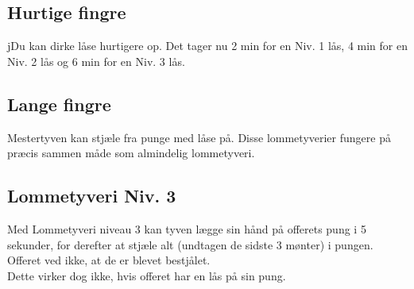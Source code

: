 \subsection*{Hurtige fingre}
jDu kan dirke låse hurtigere op. Det tager nu 2 min for en Niv. 1 lås, 4 min for en Niv. 2 lås og 6 min for en Niv. 3 lås.\\

\subsection*{Lange fingre}
Mestertyven kan stjæle fra punge med låse på. Disse lommetyverier fungere på
præcis sammen måde som almindelig lommetyveri.\\

\subsection*{Lommetyveri Niv. 3}
Med Lommetyveri niveau 3 kan tyven lægge sin hånd på offerets pung i 5 sekunder, for derefter at stjæle alt (undtagen de sidste 3 mønter) i pungen. Offeret ved ikke, at de er blevet bestjålet. \\
Dette virker dog ikke, hvis offeret har en lås på sin pung.\\